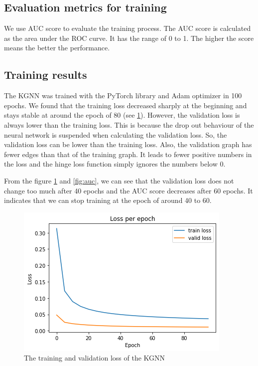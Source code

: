 \documentclass[11pt,twoside]{report}
\begin{document}
\subsection{Evaluation metrics for training}
We use AUC score to evaluate the training process. The AUC score is calculated as the area under the ROC curve. It has the range of 0 to 1. The higher the score means the better the performance.

\subsection{Training results}
The KGNN was trained with the PyTorch library and Adam optimizer in 100 epochs. We found that the training loss decreased sharply at the beginning and stays stable at around the epoch of 80 (see \ref{fig:training_loss}). However, the validation loss is always lower than the training loss. This is because the drop out behaviour of the neural network is suspended when calculating the validation loss. So, the validation loss can be lower than the training loss. Also, the validation graph has fewer edges than that of the training graph. It leads to fewer positive numbers in the loss and the hinge loss function simply ignores the numbers below 0. 

From the figure \ref{fig:training_loss} and \ref{fig:auc}, we can see that the validation loss does not change too much after 40 epochs and the AUC score decreases after 60 epochs. It indicates that we can stop training at the epoch of around 40 to 60.

\begin{figure}[H]
    \centering
    \includegraphics[scale=0.9]{loss.png}
    \caption{The training and validation loss of the KGNN}
    \label{fig:training_loss}
\end{figure}
\end{document}
